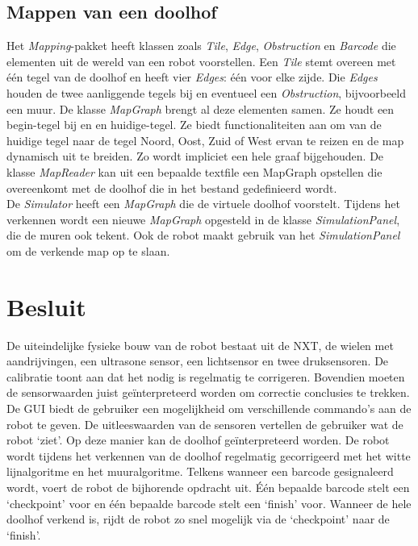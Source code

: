 \documentclass[tt3]{penoverslag}
\begin{document}
\subsection{Mappen van een doolhof} %
\label{ssec:mapping}
Het \textit{Mapping}-pakket heeft klassen zoals \textit{Tile}, \textit{Edge}, \textit{Obstruction} en \textit{Barcode} die elementen uit de wereld van een robot voorstellen. Een \textit{Tile} stemt overeen met \'e\'en tegel van de doolhof en heeft vier \textit{Edges}: \'e\'en voor elke zijde. Die \textit{Edges} houden de twee aanliggende tegels bij en eventueel een \textit{Obstruction}, bijvoorbeeld een muur. De klasse \textit{MapGraph} brengt al deze elementen samen. Ze houdt een begin-tegel bij en en huidige-tegel. Ze biedt functionaliteiten aan om van de huidige tegel naar de tegel Noord, Oost, Zuid of West ervan te reizen en de map dynamisch uit te breiden. Zo wordt impliciet een hele graaf bijgehouden. De klasse \textit{MapReader} kan uit een bepaalde textfile een MapGraph opstellen die overeenkomt met de doolhof die in het bestand gedefinieerd wordt.\\

De \textit{Simulator} heeft een \textit{MapGraph} die de virtuele doolhof voorstelt. Tijdens het verkennen wordt een nieuwe \textit{MapGraph} opgesteld in de klasse \textit{SimulationPanel}, die de muren ook tekent. Ook de robot maakt gebruik van het \textit{SimulationPanel} om de verkende map op te slaan.

\section{Besluit} %
\label{sec:besl}
De uiteindelijke fysieke bouw van de robot bestaat uit de NXT, de wielen met aandrijvingen, een ultrasone sensor, een lichtsensor en twee druksensoren. De calibratie toont aan dat het nodig is regelmatig te corrigeren. Bovendien moeten de sensorwaarden juist ge\"interpreteerd worden om correctie conclusies te trekken.\\

De GUI biedt de gebruiker een mogelijkheid om verschillende commando's aan de robot te geven. De uitleeswaarden van de sensoren vertellen de gebruiker wat de robot `ziet'. Op deze manier kan de doolhof ge\"interpreteerd worden. De robot wordt tijdens het verkennen van de doolhof regelmatig gecorrigeerd met het witte lijnalgoritme en het muuralgoritme. Telkens wanneer een barcode gesignaleerd wordt, voert de robot de bijhorende opdracht uit. \'E\'en bepaalde barcode stelt een `checkpoint' voor en \'e\'en bepaalde barcode stelt een `finish' voor. Wanneer de hele doolhof verkend is, rijdt de robot zo snel mogelijk via de `checkpoint' naar de `finish'.\\
\end{document}
